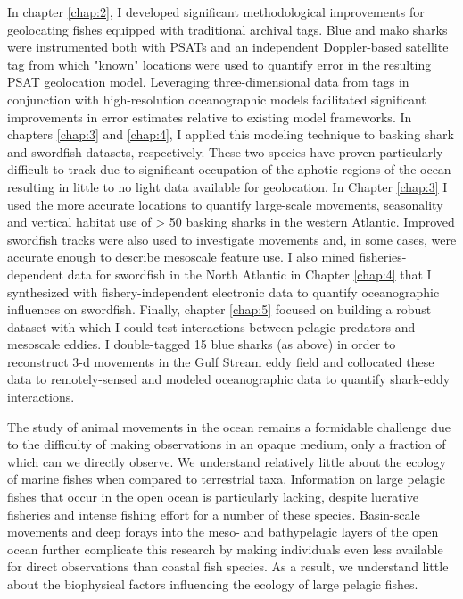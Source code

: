 In chapter \cref{chap:2}, I developed significant methodological improvements for geolocating fishes equipped with traditional archival tags. Blue and mako sharks were instrumented both with PSATs and an independent Doppler-based satellite tag from which "known" locations were used to quantify error in the resulting PSAT geolocation model. Leveraging three-dimensional data from tags in conjunction with high-resolution oceanographic models facilitated significant improvements in error estimates relative to existing model frameworks. In chapters \cref{chap:3} and \cref{chap:4}, I applied this modeling technique to basking shark and swordfish datasets, respectively. These two species have proven particularly difficult to track due to significant occupation of the aphotic regions of the ocean resulting in little to no light data available for geolocation. In Chapter \cref{chap:3} I used the more accurate locations to quantify large-scale movements, seasonality and vertical habitat use of > 50 basking sharks in the western Atlantic. Improved swordfish tracks were also used to investigate movements and, in some cases, were accurate enough to describe mesoscale feature use. I also mined fisheries-dependent data for swordfish in the North Atlantic in Chapter \cref{chap:4} that I synthesized with fishery-independent electronic data to quantify oceanographic influences on swordfish. Finally, chapter \cref{chap:5} focused on building a robust dataset with which I could test interactions between pelagic predators and mesoscale eddies. I double-tagged 15 blue sharks (as above) in order to reconstruct 3-d movements in the Gulf Stream eddy field and collocated these data to remotely-sensed and modeled oceanographic data to quantify shark-eddy interactions.



The study of animal movements in the ocean remains a formidable challenge due to the difficulty of making observations in an opaque medium, only a fraction of which can we directly observe. We understand relatively little about the ecology of marine fishes when compared to terrestrial taxa. Information on large pelagic fishes that occur in the open ocean is particularly lacking, despite lucrative fisheries and intense fishing effort for a number of these species. Basin-scale movements \citep{Skomal2009} and deep forays into the meso- and bathypelagic layers of the open ocean \citep{Thorrold2014a} further complicate this research by making individuals even less available for direct observations than coastal fish species. As a result, we understand little about the biophysical factors influencing the ecology of large pelagic fishes.

